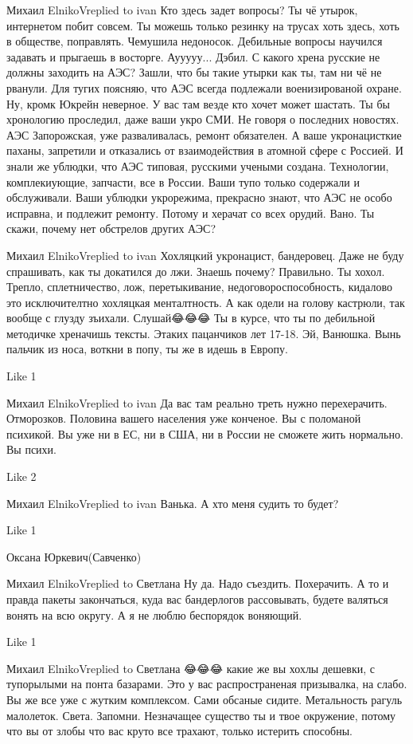  
 
 
 
 

Михаил ElnikoVreplied to ivan
Кто здесь задет вопросы?
Ты чё утырок, интернетом побит совсем. Ты можешь только резинку на трусах хоть здесь, хоть в обществе, поправлять.
Чемушила недоносок.
Дебильные вопросы научился задавать и прыгаешь в восторге.
Аууууу... Дэбил. С какого хрена русские не должны заходить на АЭС? Зашли, что бы такие утырки как ты, там ни чё не рванули.
Для тугих поясняю, что АЭС всегда подлежали военизированой охране. Ну, кромк Юкрейн неверное. У вас там везде кто хочет может шастать.
Ты бы хронологию проследил, даже ваши укро СМИ. Не говоря о последних новостях.
АЭС Запорожская, уже разваливалась, ремонт обязателен. А ваше укронацисткие паханы, запретили и отказались от взаимодействия в атомной сфере с Россией. И знали же ублюдки, что АЭС типовая, русскими учеными создана. Технологии, комплекиующие, запчасти, все в России. Ваши тупо только содержали и обслуживали.
Ваши ублюдки укрорежима, прекрасно знают, что АЭС не особо исправна, и подлежит ремонту. Потому и херачат со всех орудий.
Вано. Ты скажи, почему нет обстрелов других АЭС?

Михаил ElnikoVreplied to ivan
Хохляцкий укронацист, бандеровец.
Даже не буду спрашивать, как ты докатился до лжи.
Знаешь почему?
Правильно. Ты хохол. Трепло, сплетничество, лож, перетыкивание, недоговороспособность, кидалово это исключителтно хохляцкая менталтность.
А как одели на голову кастрюли, так вообще с глузду зъихали.
Слушай😂😂😂 Ты в курсе, что ты по дебильной методичке хреначишь тексты. Этаких пацанчиков лет 17-18.
Эй, Ванюшка. Вынь пальчик из носа, воткни в попу, ты же в идешь в Европу.

    Like 1

Михаил ElnikoVreplied to ivan
Да вас там реально треть нужно перехерачить. Отморозков.
Половина вашего населения уже конченое. Вы с поломаной психикой. Вы уже ни в ЕС, ни в США, ни в России не сможете жить нормально. Вы психи.

    Like 2

Михаил ElnikoVreplied to ivan
Ванька. А хто меня судить то будет?

    Like 1

Оксана Юркевич(Савченко)
🙈

Михаил ElnikoVreplied to Светлана
Ну да. Надо съездить. Похерачить. А то и правда пакеты закончаться, куда вас бандерлогов рассовывать, будете валяться вонять на всю округу. А я не люблю беспорядок воняющий.

    Like 1

Михаил ElnikoVreplied to Светлана
😂😂😂 какие же вы хохлы дешевки, с тупорылыми на понта базарами. Это у вас распространеная призывалка, на слабо. Вы же все уже с жутким комплексом. Сами обсаные сидите. Метальность рагуль малолеток.
Света. Запомни. Незначащее существо ты и твое окружение, потому что вы от злобы что вас круто все трахают, только истерить способны.
